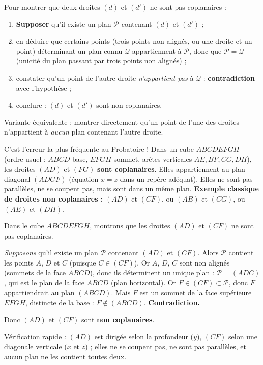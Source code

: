 \documentclass[11pt]{article}
\begin{document}
\begin{methode}
Pour montrer que deux droites $(d)$ et $(d')$ ne sont pas coplanaires :
\begin{enumerate}
\item \textbf{Supposer} qu'il existe un plan $\mathcal{P}$ contenant $(d)$ et $(d')$ ;
\item en déduire que certains points (trois points non alignés, ou une droite et un point) déterminant un plan connu $\mathcal{Q}$ appartiennent à $\mathcal{P}$, donc que $\mathcal{P} = \mathcal{Q}$ (unicité du plan passant par trois points non alignés) ;
\item constater qu'un point de l'autre droite \emph{n'appartient pas} à $\mathcal{Q}$ : \textbf{contradiction} avec l'hypothèse ;
\item conclure : $(d)$ et $(d')$ sont non coplanaires.
\end{enumerate}
Variante équivalente : montrer directement qu'un point de l'une des droites n'appartient à \emph{aucun} plan contenant l'autre droite.
\end{methode}

\begin{attention}
C'est l'erreur la plus fréquente au Probatoire ! Dans un cube $ABCDEFGH$ (ordre usuel : $ABCD$ base, $EFGH$ sommet, arêtes verticales $AE, BF, CG, DH$), les droites $(AD)$ et $(FG)$ \textbf{sont coplanaires}. Elles appartiennent au plan diagonal $(ADGF)$ (équation $x=z$ dans un repère adéquat). Elles ne sont pas parallèles, ne se coupent pas, mais sont dans un même plan.
\textbf{Exemple classique de droites non coplanaires :} $(AD)$ et $(CF)$, ou $(AB)$ et $(CG)$, ou $(AE)$ et $(DH)$.
\end{attention}

\begin{exemplebox}
Dans le cube $ABCDEFGH$, montrons que les droites $(AD)$ et $(CF)$ ne sont pas coplanaires.

\emph{Supposons} qu'il existe un plan $\mathcal{P}$ contenant $(AD)$ et $(CF)$. Alors $\mathcal{P}$ contient les points $A$, $D$ et $C$ (puisque $C \in (CF)$). Or $A$, $D$, $C$ sont non alignés (sommets de la face $ABCD$), donc ils déterminent un unique plan : $\mathcal{P} = (ADC)$, qui est le plan de la face $ABCD$ (plan horizontal). Or $F \in (CF) \subset \mathcal{P}$, donc $F$ appartiendrait au plan $(ABCD)$. Mais $F$ est un sommet de la face supérieure $EFGH$, distincte de la base : $F \notin (ABCD)$. \textbf{Contradiction.}

Donc $(AD)$ et $(CF)$ sont \textbf{non coplanaires}.

Vérification rapide : $(AD)$ est dirigée selon la profondeur ($y$), $(CF)$ selon une diagonale verticale ($x$ et $z$) ; elles ne se coupent pas, ne sont pas parallèles, et aucun plan ne les contient toutes deux.
\end{exemplebox}
\end{document}
